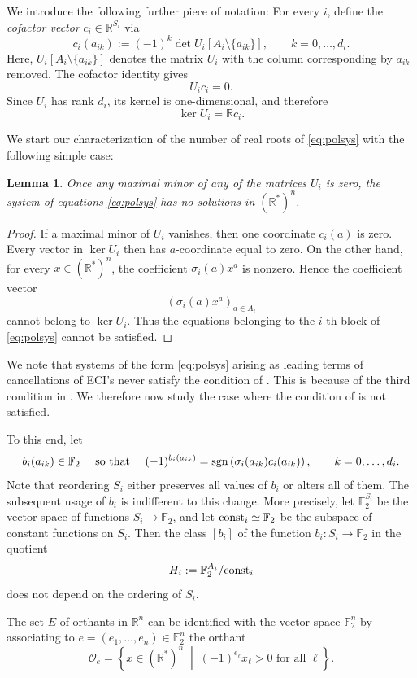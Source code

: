 \documentclass[a4paper]{article}
\newtheorem{lemma}{Lemma}
\theoremstyle{remark}
\newcommand{\setdes}[2]{\left\{#1\;\middle|\;#2\right\}}
\def\RR{\mathbb{R}}
\def\FF{\mathbb{F}}
\newcommand{\sgn}{\mathop{\rm sgn}\nolimits}
\begin{document}
We introduce the following further piece of notation: For every $i$,
define the \textit{cofactor vector} $c_i\in\RR^{S_i}$ via
$$
c_i(a_{ik})
:=
(-1)^k\det U_i[A_i\setminus\{a_{ik}\}],
\qquad
k=0,\ldots,d_i.
$$
Here, $U_i[A_i\setminus\{a_{ik}\}]$ denotes the matrix $U_i$ with the column corresponding
by $a_{ik}$ removed.
The cofactor identity gives
$$
U_ic_i=0.
$$
Since $U_i$ has rank $d_i$, its kernel is one-dimensional, and therefore
$$
\ker U_i=\RR c_i.
$$

We start our characterization of the number of real roots of
\eqref{eq:polsys} with the following simple case:
\begin{lemma}\label{ltriv}
  Once any maximal minor of any of the matrices $U_i$ is zero, the
  system of equations \eqref{eq:polsys} has no solutions in $(\RR^{*})^n$.
\end{lemma}
\begin{proof}
  If a maximal minor of $U_i$ vanishes, then one coordinate $c_i(a)$
  is zero. Every vector in $\ker U_i$ then has $a$-coordinate equal to
  zero. On the other hand, for every $x\in(\RR^*)^n$, the coefficient
  $\sigma_i(a)x^a$ is nonzero. Hence the coefficient vector
$$
(\sigma_i(a)x^a)_{a\in A_i}
$$
cannot belong to $\ker U_i$. Thus the equations belonging to the
$i$-th block of \eqref{eq:polsys} cannot be satisfied.
\end{proof}
We note that systems of the form \eqref{eq:polsys} arising as
leading terms of cancellations of ECI's never satisfy the condition of
. This is because of the third condition in
. We therefore now study the case where the
condition of  is not satisfied.

To this end, let
$$
b_i(a_{ik})\in\FF_2 \quad \text{ so that }
\quad (-1)^{b_i(a_{ik})}
=
\sgn\left(\sigma_i(a_{ik}) c_i(a_{ik})\right),
\qquad
k=0,\ldots,d_i.
$$
Note that reordering $S_{i}$ either preserves all values of $b_i$ or
alters all of them. The subsequent usage of $b_i$ is indifferent to
this change. More precisely, let $\FF_2^{S_i}$ be the vector
space of functions $S_i\to\FF_2$, and let
${\rm const}_i\simeq\FF_2$ be the subspace of constant
functions on $S_i$. Then the class $[b_i]$ of the function
$b_i:S_i\to\FF_2$ in the quotient
$$
H_i:=\FF_2^{A_i}/{\rm const}_i
$$
does not depend on the ordering of $S_i$.

The set $E$ of orthants in $\RR^n$ can be identified with
the vector space
$\mathbb F_2^n$ by associating to
$e=(e_1,\ldots,e_n)\in \mathbb F_2^n$ the orthant
$$
\mathcal O_e
=
\setdes{x\in (\RR^{*})^n}{(-1)^{e_\ell}x_\ell>0\text{ for all }\ell}.
$$
\end{document}

